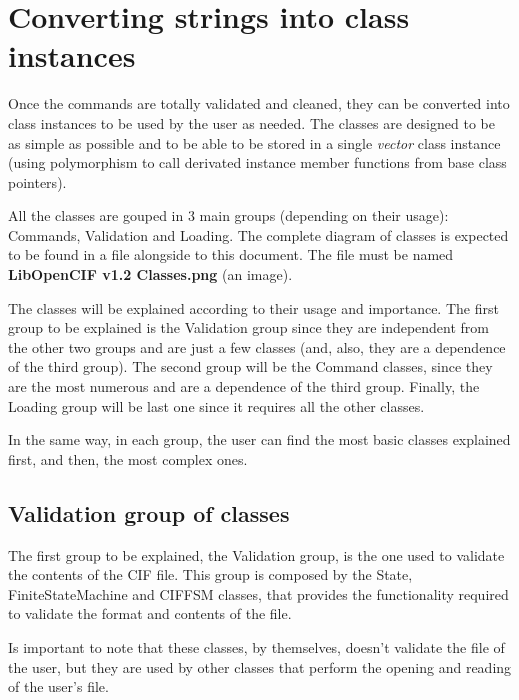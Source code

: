 \documentclass[11pt,twoside,openany,x11names,svgnames]{memoir}
\begin{document}
\section{Converting strings into class instances}\label{Converting-strings-into-class-instances}

Once the commands are totally validated and cleaned, they can be converted into class instances to be used by the user as needed. The classes are designed to be as simple as possible and to be able to be stored in a single \textit{vector} class instance (using polymorphism to call derivated instance member functions from base class pointers).

All the classes are gouped in 3 main groups (depending on their usage): Commands, Validation and Loading. The complete diagram of classes is expected to be found in a file alongside to this document. The file must be named \textbf{LibOpenCIF v1.2 Classes.png} (an image).

The classes will be explained according to their usage and importance. The first group to be explained is the Validation group since they are independent from the other two groups and are just a few classes (and, also, they are a dependence of the third group). The second group will be the Command classes, since they are the most numerous and are a dependence of the third group. Finally, the Loading group will be last one since it requires all the other classes.

In the same way, in each group, the user can find the most basic classes explained first, and then, the most complex ones.

\subsection{Validation group of classes}\label{Validation-group-of-classes}

The first group to be explained, the Validation group, is the one used to validate the contents of the CIF file. This group is composed by the State, FiniteStateMachine and CIFFSM classes, that provides the functionality required to validate the format and contents of the file.

Is important to note that these classes, by themselves, doesn't validate the file of the user, but they are used by other classes that perform the opening and reading of the user's file.
\end{document}

